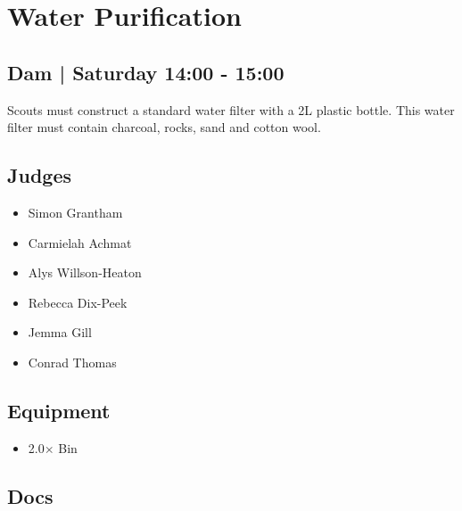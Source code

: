 \documentclass[10pt]{article}
\begin{document}
		\begin{minipage}{\linewidth}
		\setcounter{section}{4}
	\section{Water Purification }
	\subsection*{Dam | Saturday 14:00 - 15:00}

	Scouts must construct a standard water filter with a 2L plastic bottle. This water filter must contain charcoal, rocks, sand and cotton wool.

	\begin{multicols}{2}
	\subsection*{\faUsers \: Judges}
	\begin{itemize}
			\item Simon Grantham
			\item Carmielah Achmat
			\item Alys Willson-Heaton
			\item Rebecca Dix-Peek
			\item Jemma Gill
			\item Conrad Thomas
		\end{itemize}
	\columnbreak
	\subsection*{\faWrench \: Equipment}
	
        \begin{itemize}
                    \item 2.0$\times$ \: Bin
                \end{itemize}
                \vfill\null
        \subsection*{\faFile \: Docs}
     	\end{multicols}


	\vspace{1cm}
	\end{minipage}
\end{document}
